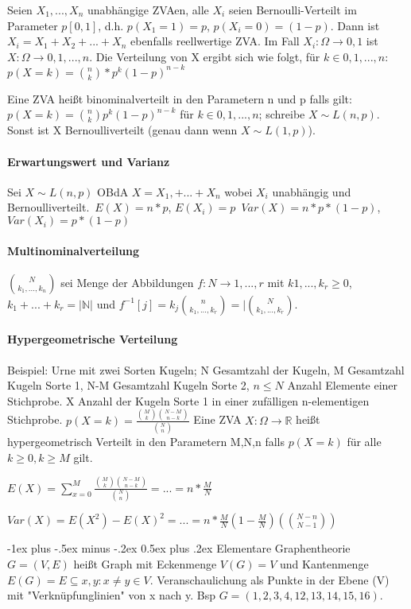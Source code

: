 \documentclass[10pt,landscape]{article}
\makeatletter
\renewcommand{\section}{\@startsection{section}{1}{0mm}%
                                {-1ex plus -.5ex minus -.2ex}%
                                {0.5ex plus .2ex}%
                                {\normalfont\large\bfseries}}
\makeatother
\begin{document}
\begin{multicols}{3}
Seien $X_1,...,X_n$ unabhängige ZVAen, alle $X_i$ seien Bernoulli-Verteilt im Parameter $p[0,1]$, d.h. $p(X_1=1)=p$, $p(X_i=0)=(1-p)$. Dann ist $X_i=X_1+X_2+...+X_n$ ebenfalls reellwertige ZVA. Im Fall $X_i:\Omega\rightarrow {0,1}$ ist $X:\Omega\rightarrow {0,1,...,n}$. Die Verteilung von X ergibt sich wie folgt, für $k\in {0,1,...,n}$: $p(X=k)=\binom{n}{k}*p^k(1-p)^{n-k}$

Eine ZVA heißt binominalverteilt in den Parametern n und p falls gilt: $p(X=k)=\binom{n}{k}p^k (1-p)^{n-k}$ für $k\in{0,1,...,n}$; schreibe $X\sim L(n,p)$. Sonst ist X Bernoulliverteilt (genau dann wenn $X\sim L(1,p)$).

\paragraph{Erwartungswert und Varianz}
Sei $X\sim L(n,p)$ OBdA $X=X_1,+...+X_n$ wobei $X_i$ unabhängig und Bernoulliverteilt.\
$E(X)=n*p$, $E(X_i)=p$\
$Var(X)=n*p*(1-p)$, $Var(X_i)=p*(1-p)$

\paragraph{Multinominalverteilung}
$\binom{N}{k_1,...,k_n}$ sei Menge der Abbildungen $f:N\rightarrow {1,...,r}$ mit $k1,...,k_r\geq 0$, $k_1+...+k_r=|\mathbb{N}|$ und $f^{-1}[{j}]=k_j \binom{n}{k_1,...,k_r} = |\binom{N}{k_1,...,k_r}$.

\paragraph{Hypergeometrische Verteilung}
Beispiel: Urne mit zwei Sorten Kugeln; N Gesamtzahl der Kugeln, M Gesamtzahl Kugeln Sorte 1, N-M Gesamtzahl Kugeln Sorte 2, $n\leq N$ Anzahl Elemente einer Stichprobe. X Anzahl der Kugeln Sorte 1 in einer zufälligen n-elementigen Stichprobe.
$p(X=k)=\frac{\binom{M}{k}\binom{N-M}{n-k}}{\binom{N}{n}}$
Eine ZVA $X:\Omega\rightarrow \mathbb{R}$ heißt hypergeometrisch Verteilt in den Parametern M,N,n falls $p(X=k)$ für alle $k\geq 0, k\geq M$ gilt.

$E(X)=\sum_{x=0}^M \frac{\binom{M}{k}\binom{N-M}{n-k}}{\binom{N}{n}}=...=n*\frac{M}{N}$

$Var(X)=E(X^2)-E(X)^2 =...= n*\frac{M}{N}(1-\frac{M}{N})(\binom{N-n}{N-1})$

\section{Elementare Graphentheorie}
$G=(V,E)$ heißt Graph mit Eckenmenge $V(G)=V$ und Kantenmenge $E(G)=E\subseteq {{x,y}:x\not=y \in V}$. Veranschaulichung als Punkte in der Ebene (V) mit "Verknüpfunglinien" von x nach y. Bsp $G=({1,2,3,4},{12,13,14,15,16})$.


\end{multicols}
\end{document}
